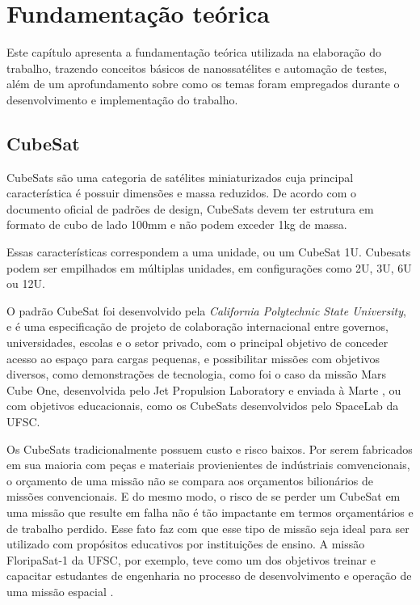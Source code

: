 \chapter{Fundamentação teórica}

\label{conceitos-fundamentais}
Este capítulo apresenta a fundamentação teórica utilizada na elaboração do trabalho, trazendo conceitos básicos de nanossatélites
e automação de testes, além de um aprofundamento sobre como os temas foram empregados durante o desenvolvimento e implementação do trabalho.

\section{CubeSat}
\label{section:cubesat}
CubeSats são uma categoria de satélites miniaturizados cuja principal característica é possuir dimensões e massa reduzidos.
De acordo com o documento oficial de padrões de design\cite{cubesat-spec}, CubeSats devem ter estrutura em formato de cubo de
lado 100mm e não podem exceder 1kg de massa.

Essas características correspondem a uma unidade, ou um CubeSat 1U. Cubesats podem ser empilhados em múltiplas unidades, em
configurações como 2U, 3U, 6U ou 12U.

O padrão CubeSat foi desenvolvido pela \textit{California Polytechnic State University}, e é uma especificação de projeto de
colaboração internacional entre governos, universidades, escolas e o setor privado, com o principal objetivo de conceder acesso
ao espaço para cargas pequenas, e possibilitar missões com objetivos diversos, como demonstrações de tecnologia, como foi o caso
da missão Mars Cube One, desenvolvida pelo Jet Propulsion Laboratory e enviada à Marte \cite{mars-cubesat}, ou com objetivos
educacionais, como os CubeSats desenvolvidos pelo SpaceLab da UFSC.

Os CubeSats tradicionalmente possuem custo e risco baixos. Por serem fabricados em sua maioria com peças e materiais provienientes
de indústriais comvencionais, o orçamento de uma missão não se compara aos orçamentos bilionários de missões convencionais.
E do mesmo modo, o risco de se perder um CubeSat em uma missão que resulte em falha não é tão impactante em termos orçamentários e
de trabalho perdido. Esse fato faz com que esse tipo de missão seja ideal para ser utilizado com propósitos educativos por instituições
de ensino. A missão FloripaSat-1 da UFSC, por exemplo, teve como um dos objetivos treinar e capacitar estudantes de engenharia no processo
de desenvolvimento e operação de uma missão espacial \cite{marcelino2020-1}.

